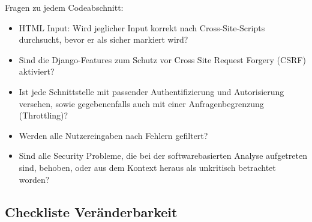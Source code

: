 \documentclass[accentcolor=tud0b,12pt,paper=a4]{tudreport}
\begin{document}
Fragen zu jedem Codeabschnitt:
\begin{multicols}{2}
\begin{itemize}
	\renewcommand{\labelitemi}{\scriptsize$\square$}
	\renewcommand{\labelitemii}{\scriptsize$\square$}
    \item HTML Input: Wird jeglicher Input korrekt nach Cross-Site-Scripts durchsucht, bevor er als sicher markiert wird?
    \item Sind die Django-Features zum Schutz vor Cross Site Request Forgery (CSRF) aktiviert?
    \item Ist jede Schnittstelle mit passender Authentifizierung und Autorisierung versehen, sowie gegebenenfalls auch mit einer Anfragenbegrenzung (Throttling)?
    \item Werden alle Nutzereingaben nach Fehlern gefiltert?
    \item Sind alle Security Probleme, die bei der softwarebasierten Analyse aufgetreten sind, behoben, oder aus dem Kontext heraus als unkritisch betrachtet worden?
\end{itemize}
\end{multicols}


\subsection{Checkliste Veränderbarkeit}
\end{document}

